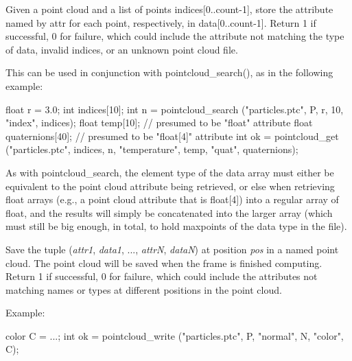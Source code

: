 \documentclass[11pt,letterpaper]{book}
\begin{document}
\apiend


Given a point cloud and a list of points {\cf indices[0..count-1]},
store the attribute named by {\cf attr} for each point, respectively, in
{\cf data[0..count-1]}.  Return 1 if successful, 0 for failure, which 
could include the attribute not matching the type of {\cf data}, invalid
indices, or an unknown point cloud file.

This can be used in conjunction with {\cf pointcloud_search()}, as
in the following example:

\begin{code}
      float r = 3.0;
      int indices[10];
      int n = pointcloud_search ("particles.ptc", P, r, 10,
                                 "index", indices);
      float temp[10];         // presumed to be "float" attribute
      float quaternions[40];  // presumed to be "float[4]" attribute
      int ok = pointcloud_get ("particles.ptc", indices, n,
                               "temperature", temp,
                               "quat", quaternions);
\end{code}

As with {\cf pointcloud_search}, the element type of the data array must
either be equivalent to the point cloud attribute being retrieved, or else
when retrieving {\cf float} arrays (e.g., a point cloud attribute
that is {\cf float[4]}) into a regular array of {\cf float}, and the
results will simply be concatenated into the larger array (which must
still be big enough, in total, to hold {\cf maxpoints} of the data type
in the file).
\apiend




Save the tuple (\emph{attr1}, \emph{data1}, ..., \emph{attrN},
\emph{dataN}) at position \emph{pos} in a named point cloud.  The point
cloud will be saved when the frame is finished computing.  Return 1 if
successful, 0 for failure, which could include the attributes not
matching names or types at different positions in the point cloud.

Example:
\begin{code}
      color C = ...;
      int ok = pointcloud_write ("particles.ptc", P, "normal", N, "color", C);
\end{code}
\apiend
\end{document}
